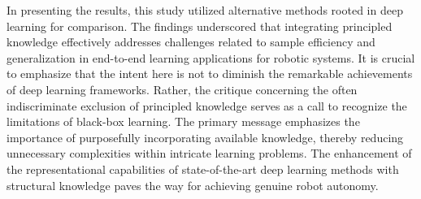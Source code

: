\documentclass[12pt, a4paper]{article}
\newcommand{\redtext}[1]{\textcolor{red}{#1}}
\begin{document}
In presenting the results, this study utilized alternative methods rooted in deep learning for comparison. The findings underscored that integrating principled knowledge effectively addresses challenges related to sample efficiency and generalization in end-to-end learning applications for robotic systems. It is crucial to emphasize that the intent here is not to diminish the remarkable achievements of deep learning frameworks. Rather, the critique concerning the often indiscriminate exclusion of principled knowledge serves as a call to recognize the limitations of black-box learning. The primary message emphasizes the importance of purposefully incorporating available knowledge, thereby reducing unnecessary complexities within intricate learning problems. The enhancement of the representational capabilities of state-of-the-art deep learning methods with structural knowledge paves the way for achieving genuine robot autonomy.

%
%
%
%
\end{document}
